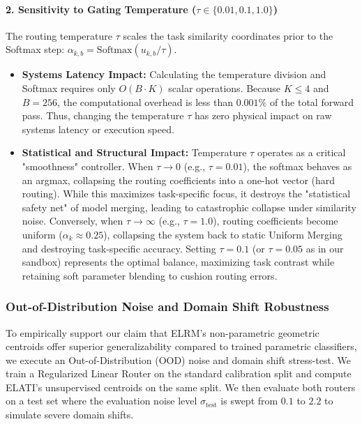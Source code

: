 \paragraph{2. Sensitivity to Gating Temperature ($\tau \in \{0.01, 0.1, 1.0\}$)}
The routing temperature $\tau$ scales the task similarity coordinates prior to the Softmax step: $\alpha_{k, b} = \text{Softmax}(u_{k, b} / \tau)$.
\begin{itemize}
    \item \textbf{Systems Latency Impact:} Calculating the temperature division and Softmax requires only $O(B \cdot K)$ scalar operations. Because $K \le 4$ and $B = 256$, the computational overhead is less than $0.001\%$ of the total forward pass. Thus, changing the temperature $\tau$ has zero physical impact on raw systems latency or execution speed.
    \item \textbf{Statistical and Structural Impact:} Temperature $\tau$ operates as a critical "smoothness" controller. When $\tau \to 0$ (e.g., $\tau = 0.01$), the softmax behaves as an argmax, collapsing the routing coefficients into a one-hot vector (hard routing). While this maximizes task-specific focus, it destroys the "statistical safety net" of model merging, leading to catastrophic collapse under similarity noise. Conversely, when $\tau \to \infty$ (e.g., $\tau = 1.0$), routing coefficients become uniform ($\alpha_k \approx 0.25$), collapsing the system back to static Uniform Merging and destroying task-specific accuracy. Setting $\tau = 0.1$ (or $\tau = 0.05$ as in our sandbox) represents the optimal balance, maximizing task contrast while retaining soft parameter blending to cushion routing errors.
\end{itemize}

\subsubsection{Out-of-Distribution Noise and Domain Shift Robustness}
\label{subsec:ood_robustness}
To empirically support our claim that ELRM's non-parametric geometric centroids offer superior generalizability compared to trained parametric classifiers, we execute an Out-of-Distribution (OOD) noise and domain shift stress-test. We train a Regularized Linear Router on the standard calibration split and compute ELATI's unsupervised centroids on the same split. We then evaluate both routers on a test set where the evaluation noise level $\sigma_{\text{test}}$ is swept from $0.1$ to $2.2$ to simulate severe domain shifts.

